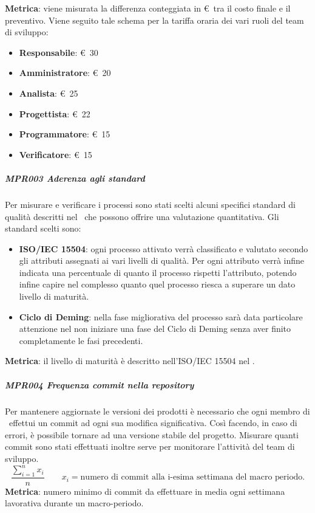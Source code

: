 				\textbf{Metrica}: viene misurata la differenza conteggiata in \euro\ tra il costo finale e il preventivo.
				Viene seguito tale schema per la tariffa oraria dei vari ruoli del team di sviluppo:

				\begin{itemize} %
					\item \textbf{Responsabile}: \euro\ 30
					\item \textbf{Amministratore}: \euro\ 20
					\item \textbf{Analista}: \euro\ 25
					\item \textbf{Progettista}: \euro\ 22
					\item \textbf{Programmatore}: \euro\ 15
					\item \textbf{Verificatore}: \euro\ 15
				\end{itemize}

				\subparagraph{MPR003 Aderenza agli standard}
				Per misurare e verificare i processi sono stati scelti alcuni specifici standard di qualità descritti nel \PdQ\ che possono offrire una valutazione quantitativa.
				Gli standard scelti sono:

				\begin{itemize}
				\item \textbf{ISO/IEC 15504}: ogni processo attivato verrà classificato e valutato secondo gli attributi assegnati ai vari livelli di qualità. Per ogni attributo verrà infine indicata una percentuale di quanto il processo rispetti l'attributo, potendo infine capire nel complesso quanto quel processo riesca a superare un dato livello di maturità.
				\item \textbf{Ciclo di Deming}: nella fase migliorativa del processo sarà data particolare attenzione nel non iniziare una fase del Ciclo di Deming senza aver finito completamente le fasi precedenti.
				\end{itemize}

				\textbf{Metrica}: il livello di maturità è descritto nell'ISO/IEC 15504 nel \Doc{\PdQv}.

				\subparagraph{MPR004 Frequenza commit nella repository}
				Per mantenere aggiornate le versioni dei prodotti è necessario che ogni membro di \gruppo\ effettui un commit ad ogni sua modifica significativa.
				Così facendo, in caso di errori, è possibile tornare ad una versione stabile del progetto.
				Misurare quanti commit sono stati effettuati inoltre serve per monitorare l'attività del team di sviluppo.
				\[\dfrac{\sum_{i=1}^{n} x_i}{n} \qquad x_i=\text{numero di commit alla i-esima settimana del macro periodo.}\]
				\textbf{Metrica}: numero minimo di commit da effettuare in media ogni settimana lavorativa durante un macro-periodo.

